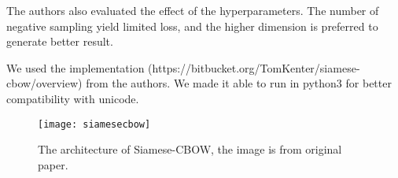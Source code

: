 The authors also evaluated the effect of the hyperparameters. The number of negative sampling yield limited loss, and the higher dimension is preferred to generate better result.

We used the implementation (https://bitbucket.org/TomKenter/siamese-cbow/overview) from the authors.
We made it able to run in python3 for better compatibility with unicode.

\begin{figure}[h]
    \centering
	\texttt{[image: siamesecbow]}
    \caption{The architecture of Siamese-CBOW, the image is from original paper\cite{kenter2016siamesecbow}.}
    \label{fig:siamese}
\end{figure}
